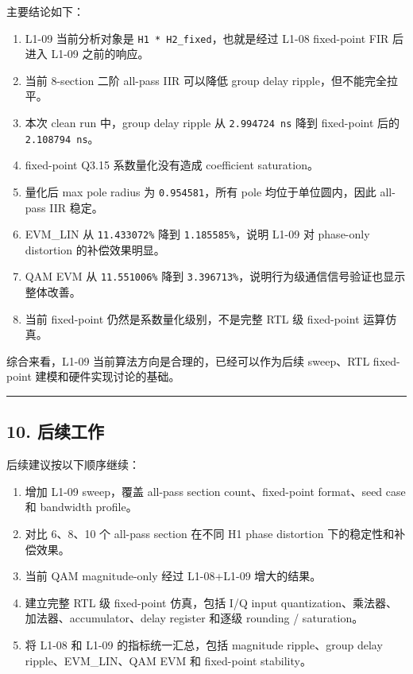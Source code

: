 \documentclass[
]{ctexart}
\providecommand{\tightlist}{%
  \setlength{\itemsep}{0pt}\setlength{\parskip}{0pt}}
\begin{document}
主要结论如下：

\begin{enumerate}
\def\labelenumi{\arabic{enumi}.}
\tightlist
\item
  L1-09 当前分析对象是 \texttt{H1\ *\ H2\_fixed}，也就是经过 L1-08
  fixed-point FIR 后进入 L1-09 之前的响应。
\item
  当前 8-section 二阶 all-pass IIR 可以降低 group delay
  ripple，但不能完全拉平。
\item
  本次 clean run 中，group delay ripple 从 \texttt{2.994724\ ns} 降到
  fixed-point 后的 \texttt{2.108794\ ns}。
\item
  fixed-point Q3.15 系数量化没有造成 coefficient saturation。
\item
  量化后 max pole radius 为 \texttt{0.954581}，所有 pole
  均位于单位圆内，因此 all-pass IIR 稳定。
\item
  EVM\_LIN 从 \texttt{11.433072\%} 降到 \texttt{1.185585\%}，说明 L1-09
  对 phase-only distortion 的补偿效果明显。
\item
  QAM EVM 从 \texttt{11.551006\%} 降到
  \texttt{3.396713\%}，说明行为级通信信号验证也显示整体改善。
\item
  当前 fixed-point 仍然是系数量化级别，不是完整 RTL 级 fixed-point
  运算仿真。
\end{enumerate}

综合来看，L1-09 当前算法方向是合理的，已经可以作为后续 sweep、RTL
fixed-point 建模和硬件实现讨论的基础。

\begin{center}\rule{0.5\linewidth}{0.5pt}\end{center}

\subsection{10. 后续工作}\label{ux540eux7eedux5de5ux4f5c}

后续建议按以下顺序继续：

\begin{enumerate}
\def\labelenumi{\arabic{enumi}.}
\tightlist
\item
  增加 L1-09 sweep，覆盖 all-pass section count、fixed-point
  format、seed case 和 bandwidth profile。
\item
  对比 6、8、10 个 all-pass section 在不同 H1 phase distortion
  下的稳定性和补偿效果。
\item
  当前 QAM magnitude-only 经过 L1-08+L1-09 增大的结果。
\item
  建立完整 RTL 级 fixed-point 仿真，包括 I/Q input
  quantization、乘法器、加法器、accumulator、delay register 和逐级
  rounding / saturation。
\item
  将 L1-08 和 L1-09 的指标统一汇总，包括 magnitude ripple、group delay
  ripple、EVM\_LIN、QAM EVM 和 fixed-point stability。
\end{enumerate}
\end{document}

